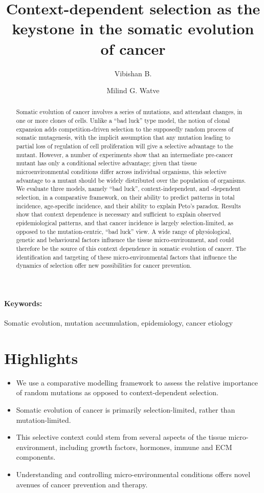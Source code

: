 \documentclass[12pt,onecolumn,twoside]{article}
\author[1]{Vibishan B.}
\author[1,*]{Milind G. Watve}
\affil[1]{Department of Biology, Indian Institute of Science Education and Research (IISER), Pune}
\affil[*]{Corresponding author: milind@iiserpune.ac.in}
\title{Context-dependent selection as the keystone in the somatic evolution of cancer}
\begin{document}
\maketitle
\begin{abstract}
	Somatic evolution of cancer involves a series of mutations, and attendant changes, in one or more clones of cells. Unlike a ``bad luck'' type model, the notion of clonal expansion adds competition-driven selection to the supposedly random process of somatic mutagenesis, with the implicit assumption that any mutation leading to partial loss of regulation of cell proliferation will give a selective advantage to the mutant. However, a number of experiments show that an intermediate pre-cancer mutant has only a conditional selective advantage; given that tissue microenvironmental conditions differ across individual organisms, this selective advantage to a mutant should be widely distributed over the population of organisms. We evaluate three models, namely ``bad luck'', context-independent, and -dependent selection, in a comparative framework, on their ability to predict patterns in total incidence, age-specific incidence, and their ability to explain Peto's paradox. Results show that context dependence is necessary and sufficient to explain observed epidemiological patterns, and that cancer incidence is largely selection-limited, as opposed to the mutation-centric, ``bad luck'' view. A wide range of physiological, genetic and behavioural factors influence the tissue micro-environment, and could therefore be the source of this context dependence in somatic evolution of cancer. The identification and targeting of these micro-environmental factors that influence the dynamics of selection offer new possibilities for cancer prevention.
\end{abstract}

\paragraph{Keywords:} Somatic evolution, mutation accumulation, epidemiology, cancer etiology
\pagebreak

\section*{Highlights}
	\begin{itemize}
	\item We use a comparative modelling framework to assess the relative importance of random mutations as opposed to context-dependent selection.
	\item Somatic evolution of cancer is primarily selection-limited, rather than mutation-limited.
	\item This selective context could stem from several aspects of the tissue micro-environment, including growth factors, hormones, immune and ECM components.
	\item Understanding and controlling micro-environmental conditions offers novel avenues of cancer prevention and therapy.
	\end{itemize}
\end{document}
